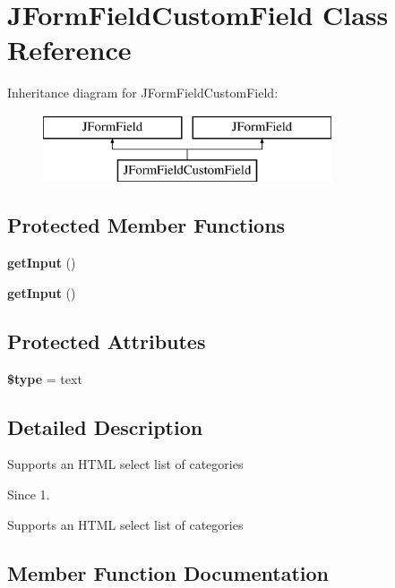 \section{J\+Form\+Field\+Custom\+Field Class Reference}
\label{class_j_form_field_custom_field}
Inheritance diagram for J\+Form\+Field\+Custom\+Field\+:\begin{figure}[H]
\begin{center}
\leavevmode
\includegraphics[height=2.000000cm]{class_j_form_field_custom_field}
\end{center}
\end{figure}
\subsection*{Protected Member Functions}
\begin{DoxyCompactItemize}
\item 
\textbf{ get\+Input} ()
\item 
\textbf{ get\+Input} ()
\end{DoxyCompactItemize}
\subsection*{Protected Attributes}
\begin{DoxyCompactItemize}
\item 
\textbf{ \$type} = \textquotesingle{}text\textquotesingle{}
\end{DoxyCompactItemize}


\subsection{Detailed Description}
Supports an H\+T\+ML select list of categories

\begin{DoxySince}{Since}
1.
\end{DoxySince}
Supports an H\+T\+ML select list of categories 

\subsection{Member Function Documentation}
\mbox{\label{class_j_form_field_custom_field_a4380f30ae9202fa49ebd2439572f9cdb}} 
